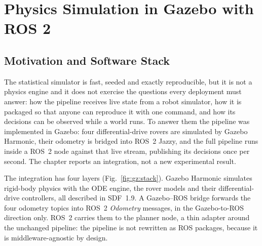 \chapter{Physics Simulation in Gazebo with ROS 2}
\label{ch:gazebo}

\section{Motivation and Software Stack}

The statistical simulator is fast, seeded and exactly reproducible, but it is
not a physics engine and it does not exercise the questions every deployment
must answer: how the pipeline receives live state from a robot simulator, how
it is packaged so that anyone can reproduce it with one command, and how its
decisions can be observed while a world runs. To answer them the pipeline was
implemented in Gazebo: four differential-drive rovers are simulated by Gazebo
Harmonic, their odometry is bridged into ROS~2 Jazzy, and the full pipeline
runs inside a ROS~2 node against that live stream, publishing its decisions
once per second. The chapter reports an integration, not a new experimental
result.

The integration has four layers (Fig.~\ref{fig:gz:stack}). Gazebo Harmonic
simulates rigid-body physics with the ODE engine, the rover models and their
differential-drive controllers, all described in SDF~1.9. A Gazebo--ROS bridge
forwards the four odometry topics into ROS~2 \emph{Odometry} messages, in the
Gazebo-to-ROS direction only. ROS~2 carries them to the planner node, a thin
adapter around the unchanged pipeline: the pipeline is not rewritten as ROS
packages, because it is middleware-agnostic by design.

